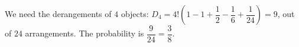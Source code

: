 We need the derangements of $4$ objects: $D_4=4!\left(1-1+\dfrac{1}{2}-\dfrac{1}{6}+\dfrac{1}{24}\right)=9$, out of $24$ arrangements. The probability is $\dfrac{9}{24}=\boxed{\dfrac{3}{8}}$.
